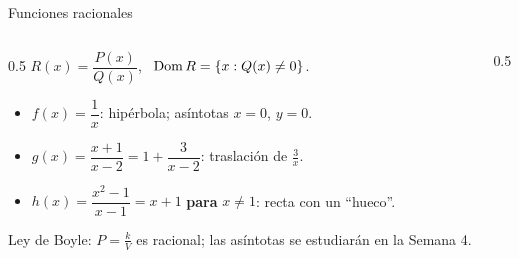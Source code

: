 \documentclass[10pt,aspectratio=169]{beamer}
\begin{document}
\begin{frame}{Funciones racionales}
  \begin{columns}
    \begin{column}{0.5\textwidth}
      $R(x)=\dfrac{P(x)}{Q(x)}$, \ $\operatorname{Dom} R=\{x:Q(x)\neq0\}$.
      \begin{ejemplo}
        \begin{itemize}
          \item $f(x)=\dfrac1x$: hipérbola; asíntotas $x=0$, $y=0$.
          \item $g(x)=\dfrac{x+1}{x-2}=1+\dfrac{3}{x-2}$: traslación de $\frac3x$.
          \item $h(x)=\dfrac{x^2-1}{x-1}=x+1$ \textbf{para} $x\neq1$: recta con un ``hueco''.
        \end{itemize}
      \end{ejemplo}
      \small Ley de Boyle: $P=\frac kV$ es racional; las asíntotas se estudiarán en la Semana 4.
    \end{column}
    \begin{column}{0.5\textwidth}
      \centering
    \end{column}
  \end{columns}
\end{frame}
\end{document}
